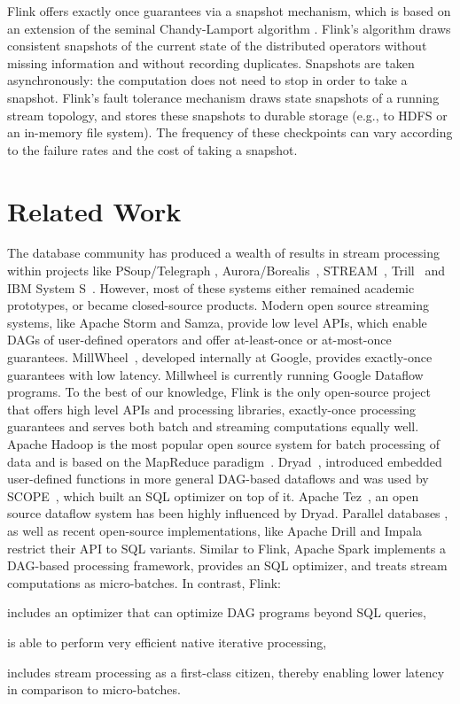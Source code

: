 \documentclass{llncs}
\begin{document}
Flink offers exactly once guarantees via a snapshot mechanism, which is based on an extension \cite{carbone2015lightweight} of the seminal Chandy-Lamport algorithm \cite{chandy1985distributed}. Flink's algorithm draws consistent snapshots of the current state of the distributed operators without missing information and without recording duplicates. Snapshots are taken asynchronously: the computation does not need to stop in order to take a snapshot. Flink’s fault tolerance mechanism draws state snapshots of a running stream topology, and stores these snapshots to durable storage (e.g., to HDFS or an in-memory file system). The frequency of these checkpoints can vary according to the failure rates and the cost of taking a snapshot.

\section{Related Work}
\label{sec:related}
The database community has produced a wealth of results in stream processing within projects like PSoup/Telegraph \cite{chandrasekaran2003psoup}, Aurora/Borealis~\cite{abadi2005design}, STREAM~\cite{arasu2004stream}, Trill~\cite{chandramouli2014trill} and IBM System S~\cite{gedik2008spade}. However, most of these systems either remained academic prototypes, or became closed-source products. Modern open source streaming systems, like Apache Storm and Samza, provide low level APIs, which enable DAGs of user-defined operators and offer at-least-once or at-most-once guarantees. MillWheel~\cite{akidau2013millwheel}, developed internally at Google, provides exactly-once guarantees with low latency. Millwheel is currently running Google Dataflow~\cite{akidau2015dataflow} programs. To the best of our knowledge, Flink is the only open-source project that offers high level APIs and processing libraries, exactly-once processing guarantees and serves both batch and streaming computations equally well. Apache Hadoop is the most popular open source system for batch processing of data and is based on the MapReduce paradigm~\cite{DBLP:journals/cacm/DeanG08}. Dryad~\cite{isard2007dryad}, introduced embedded user-defined functions in more general DAG-based dataflows and was used by SCOPE~\cite{scopeOptimizer}, which built an SQL optimizer on top of it. Apache Tez~\cite{saha2015apache}, an open source dataflow system has been highly influenced by Dryad. Parallel databases \cite{dewitt1990gamma}, as well as recent open-source implementations, like Apache Drill and Impala~\cite{kornacker2015impala} restrict their API to SQL variants. Similar to Flink, Apache Spark \cite{DBLP:conf/hotcloud/ZahariaCFSS10} implements a DAG-based processing framework, provides an SQL optimizer, and treats stream computations as micro-batches. In contrast, Flink:  
\begin{inparaenum}[i)]
  \item includes an optimizer that can optimize DAG programs beyond SQL queries,
  \item is able to perform very efficient native iterative processing,
  \item includes stream processing as a first-class citizen, thereby enabling lower latency in comparison to micro-batches.
\end{inparaenum}
\end{document}
